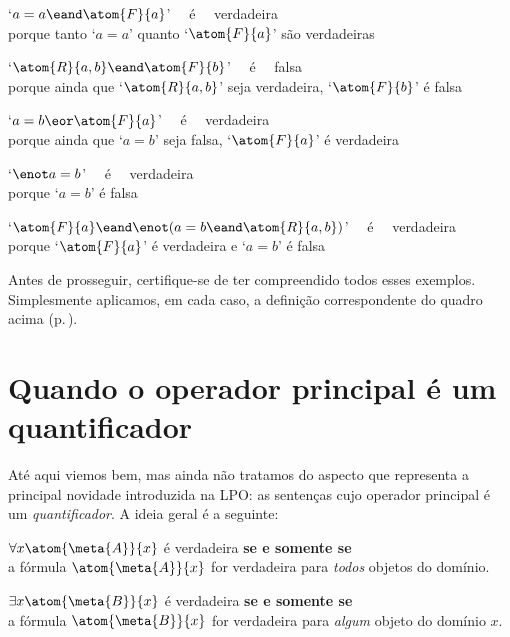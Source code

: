	\begin{earg}
		\item[\textbullet] `$a = a \eand \atom{F}{a}$' \ \ é \ \ verdadeira\\
			porque tanto `$a = a$' quanto `$\atom{F}{a}$' são verdadeiras
		\item[\textbullet] `$\atom{R}{a,b} \eand \atom{F}{b}$' \ \ é \ \ falsa\\
			porque ainda que `$\atom{R}{a,b}$' seja verdadeira, `$\atom{F}{b}$' é falsa\\
		\item[\textbullet] `$a = b \eor \atom{F}{a}$' \ \ é \ \ verdadeira\\
			porque ainda que  `$a = b$' seja falsa, `$\atom{F}{a}$' é verdadeira\\
		\item[\textbullet] `$\enot a = b$' \ \ é \ \ verdadeira\\
			porque `$a = b$' é falsa\\
		\item[\textbullet] `$\atom{F}{a} \eand \enot( a= b \eand \atom{R}{a,b})$' \ \ é \ \ verdadeira\\
			porque `$\atom{F}{a}$' é verdadeira e `$a = b$' é falsa
	\end{earg}
Antes de prosseguir, certifique-se de ter compreendido todos esses exemplos.
Simplesmente aplicamos, em cada caso, a definição correspondente do quadro acima (p.\,\pageref{b:ConSent}). 


\section[Quantificadores]{Quando o operador principal é um quantificador}\label{s:MainLogicalOperatorQuantifier}

Até aqui viemos bem, mas ainda não tratamos do aspecto que representa a principal novidade introduzida na LPO:
as sentenças cujo operador principal é um \emph{quantificador}.
A ideia geral é a seguinte:
	\begin{earg}
	\item[\textbullet] $\forall x \atom{\meta{A}}{x}$ é verdadeira \textbf{se e somente se}\\ a fórmula
			$\atom{\meta{A}}{x}$ for verdadeira para \emph{todos} objetos do domínio.\\
		\item[\textbullet] $\exists x \atom{\meta{B}}{x}$ é verdadeira  \textbf{se e somente se} \\ a fórmula
			$\atom{\meta{B}}{x}$ for verdadeira para \emph{algum} objeto do domínio $x$.
	\end{earg}

